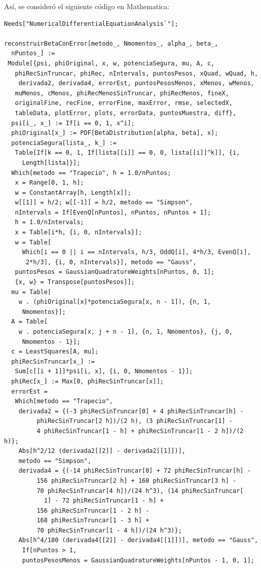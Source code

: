 \documentclass[titlepage,11pt]{report}
\begin{document}
Así, se consideró el siguiente código en Mathematica:
\begin{lstlisting}
Needs["NumericalDifferentialEquationAnalysis`"];

reconstruirBetaConError[metodo_, Nmomentos_, alpha_, beta_, 
  nPuntos_] := 
 Module[{psi, phiOriginal, x, w, potenciaSegura, mu, A, c, 
   phiRecSinTruncar, phiRec, nIntervals, puntosPesos, xQuad, wQuad, h,
    derivada2, derivada4, errorEst, puntosPesosMenos, xMenos, wMenos, 
   muMenos, cMenos, phiRecMenosSinTruncar, phiRecMenos, fineX, 
   originalFine, recFine, errorFine, maxError, rmse, selectedX, 
   tableData, plotError, plots, errorData, puntosMuestra, diff}, 
  psi[i_, x_] := If[i == 0, 1, x^i];
  phiOriginal[x_] := PDF[BetaDistribution[alpha, beta], x];
  potenciaSegura[lista_, k_] := 
   Table[If[k == 0, 1, If[lista[[i]] == 0, 0, lista[[i]]^k]], {i, 
     Length[lista]}];
  Which[metodo == "Trapecio", h = 1.0/nPuntos;
   x = Range[0, 1, h];
   w = ConstantArray[h, Length[x]];
   w[[1]] = h/2; w[[-1]] = h/2, metodo == "Simpson", 
   nIntervals = If[EvenQ[nPuntos], nPuntos, nPuntos + 1];
   h = 1.0/nIntervals;
   x = Table[i*h, {i, 0, nIntervals}];
   w = Table[
     Which[i == 0 || i == nIntervals, h/3, OddQ[i], 4*h/3, EvenQ[i], 
      2*h/3], {i, 0, nIntervals}], metodo == "Gauss", 
   puntosPesos = GaussianQuadratureWeights[nPuntos, 0, 1];
   {x, w} = Transpose[puntosPesos]];
  mu = Table[
    w . (phiOriginal[x]*potenciaSegura[x, n - 1]), {n, 1, 
     Nmomentos}];
  A = Table[
    w . potenciaSegura[x, j + n - 1], {n, 1, Nmomentos}, {j, 0, 
     Nmomentos - 1}];
  c = LeastSquares[A, mu];
  phiRecSinTruncar[x_] := 
   Sum[c[[i + 1]]*psi[i, x], {i, 0, Nmomentos - 1}];
  phiRec[x_] := Max[0, phiRecSinTruncar[x]];
  errorEst = 
   Which[metodo == "Trapecio", 
    derivada2 = {(-3 phiRecSinTruncar[0] + 4 phiRecSinTruncar[h] - 
         phiRecSinTruncar[2 h])/(2 h), (3 phiRecSinTruncar[1] - 
         4 phiRecSinTruncar[1 - h] + phiRecSinTruncar[1 - 2 h])/(2 h)};
    Abs[h^2/12 (derivada2[[2]] - derivada2[[1]])], 
    metodo == "Simpson", 
    derivada4 = {(-14 phiRecSinTruncar[0] + 72 phiRecSinTruncar[h] - 
         156 phiRecSinTruncar[2 h] + 168 phiRecSinTruncar[3 h] - 
         70 phiRecSinTruncar[4 h])/(24 h^3), (14 phiRecSinTruncar[
           1] - 72 phiRecSinTruncar[1 - h] + 
         156 phiRecSinTruncar[1 - 2 h] - 
         168 phiRecSinTruncar[1 - 3 h] + 
         70 phiRecSinTruncar[1 - 4 h])/(24 h^3)};
    Abs[h^4/180 (derivada4[[2]] - derivada4[[1]])], metodo == "Gauss",
     If[nPuntos > 1, 
     puntosPesosMenos = GaussianQuadratureWeights[nPuntos - 1, 0, 1];

\end{lstlisting}
\end{document}

